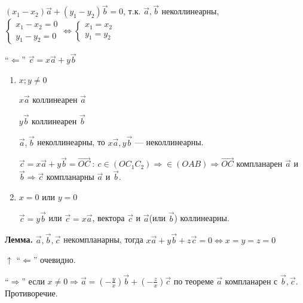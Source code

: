 \documentclass{article}
\begin{document}
    \((x_1-x_2)\overrightarrow{a} + (y_1-y_2)\overrightarrow{b} = 0\), т.к. \(\overrightarrow{a}, \overrightarrow{b}\) неколлинеарны, \(\begin{cases} x_1-x_2=0\\ y_1-y_2=0 \end{cases} \Leftrightarrow \begin{cases} x_1=x_2\\ y_1=y_2\end{cases}\)

    ``\(\Leftarrow\)'' \( \overrightarrow{c} = x\overrightarrow{a} + y\overrightarrow{b} \)

    \begin{enumerate}
        \item \( x; y \neq 0 \)
    
        \( x\overrightarrow{a} \) коллинеарен \( \overrightarrow{a} \)
        
        \( y\overrightarrow{b} \) коллинеарен \( \overrightarrow{b} \)

        \( \overrightarrow{a}, \overrightarrow{b} \) неколлинеарны, то \(x\overrightarrow{a}, y\overrightarrow{b}\) --- неколлинеарны.

        
        \( \overrightarrow{c} = x\overrightarrow{a} + y\overrightarrow{b} = \overrightarrow{OC}\ :\ c \in (OC_1C_2) \Rightarrow \in (OAB) \Rightarrow \overrightarrow{OC} \) компланарен \(\overrightarrow{a}\) и \(\overrightarrow{b} \Rightarrow \overrightarrow{c}\) компланарны \(\overrightarrow{a}\) и \(\overrightarrow{b}\).
    
        \item \(x = 0\) или \(y = 0\)
        
        \(\overrightarrow{c} = y\overrightarrow{b}\) или \(\overrightarrow{c} = x\overrightarrow{a}\), вектора \(\overrightarrow{c}\) и \(\overrightarrow{a}\)(или \(\overrightarrow{b}\)) коллинеарны.
    \end{enumerate}
    
    \textbf{Лемма.} \( \overrightarrow{a}, \overrightarrow{b}, \overrightarrow{c} \) некомпланарны, тогда \( x\overrightarrow{a} + y\overrightarrow{b} + z\overrightarrow{c} = 0 \Leftrightarrow x = y = z = 0 \)

    \(\uparrow\) ``\(\Leftarrow\)'' очевидно.

    ``\(\Rightarrow\)'' если \( x \neq 0 \Rightarrow \overrightarrow{a} = (-\frac{y}{x})\overrightarrow{b} + (-\frac{z}{x})\overrightarrow{c} \) по теореме \(\overrightarrow{a}\) компланарен с \(\overrightarrow{b}, \overrightarrow{c}\). Противоречие. 
\end{document}
